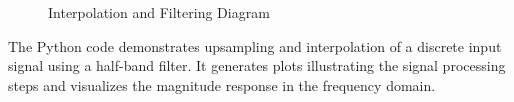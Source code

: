 \documentclass{article}
\begin{document}
\begin{figure}[htbp]
\caption{Interpolation and Filtering Diagram}
    \label{fig:interpolation-diagram}
\end{figure}
The Python code demonstrates upsampling and interpolation of a discrete input signal using a half-band filter. It generates plots illustrating the signal processing steps 
and visualizes the magnitude response in the frequency domain.
\begin{center}
\end{center}
\end{document}
